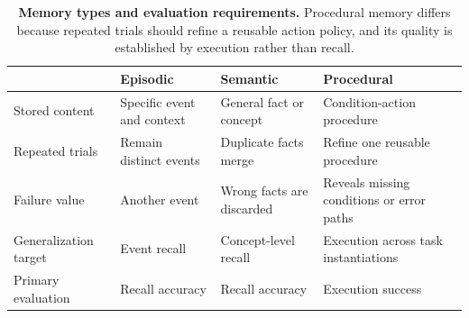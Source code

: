 \begin{table}[th]
\caption{\textbf{Memory types and evaluation requirements.} Procedural memory
differs because repeated trials should refine a reusable action policy, and its
quality is established by execution rather than recall.}
\label{tab:memory-types}
\centering
\small
\begin{tabularx}{\linewidth}{@{}lXXX@{}}
\toprule
 & Episodic & Semantic & Procedural \\
\midrule
Stored content &
Specific event and context &
General fact or concept &
Condition-action procedure \\
Repeated trials &
Remain distinct events &
Duplicate facts merge &
Refine one reusable procedure \\
Failure value &
Another event &
Wrong facts are discarded &
Reveals missing conditions or error paths \\
Generalization target &
Event recall &
Concept-level recall &
Execution across task instantiations \\
Primary evaluation &
Recall accuracy &
Recall accuracy &
Execution success \\
\bottomrule
\end{tabularx}
\end{table}
